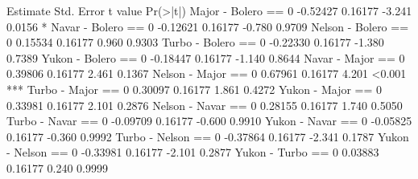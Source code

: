                      Estimate Std. Error t value Pr(>|t|)    
Major - Bolero == 0  -0.52427    0.16177  -3.241   0.0156 *  
Navar - Bolero == 0  -0.12621    0.16177  -0.780   0.9709    
Nelson - Bolero == 0  0.15534    0.16177   0.960   0.9303    
Turbo - Bolero == 0  -0.22330    0.16177  -1.380   0.7389    
Yukon - Bolero == 0  -0.18447    0.16177  -1.140   0.8644    
Navar - Major == 0    0.39806    0.16177   2.461   0.1367    
Nelson - Major == 0   0.67961    0.16177   4.201   <0.001 ***
Turbo - Major == 0    0.30097    0.16177   1.861   0.4272    
Yukon - Major == 0    0.33981    0.16177   2.101   0.2876    
Nelson - Navar == 0   0.28155    0.16177   1.740   0.5050    
Turbo - Navar == 0   -0.09709    0.16177  -0.600   0.9910    
Yukon - Navar == 0   -0.05825    0.16177  -0.360   0.9992    
Turbo - Nelson == 0  -0.37864    0.16177  -2.341   0.1787    
Yukon - Nelson == 0  -0.33981    0.16177  -2.101   0.2877    
Yukon - Turbo == 0    0.03883    0.16177   0.240   0.9999    
